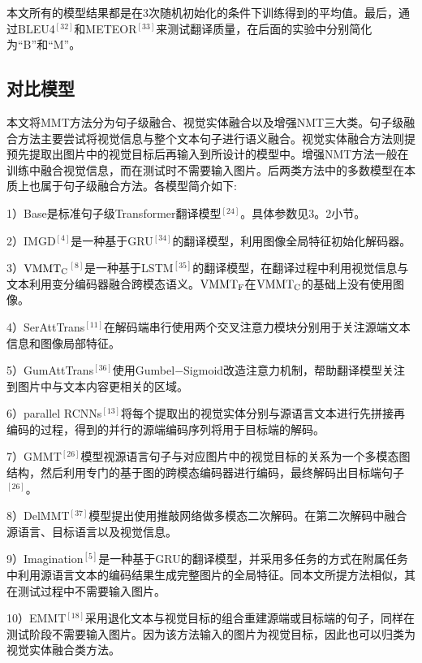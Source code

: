 本文所有的模型结果都是在3次随机初始化的条件下训练得到的平均值。最后，通过BLEU4$^{[32]}$和METEOR$^{[33]}$来测试翻译质量，在后面的实验中分别简化为``B''和``M''。


\subsection{对比模型}
本文将MMT方法分为句子级融合、视觉实体融合以及增强NMT三大类。句子级融合方法主要尝试将视觉信息与整个文本句子进行语义融合。视觉实体融合方法则提预先提取出图片中的视觉目标后再输入到所设计的模型中。增强NMT方法一般在训练中融合视觉信息，而在测试时不需要输入图片。后两类方法中的多数模型在本质上也属于句子级融合方法。各模型简介如下:

1）Base是标准句子级Transformer翻译模型$^{[24]}$。具体参数见3。2小节。

2）IMGD$^{[4]}$是一种基于GRU$^{[34]}$的翻译模型，利用图像全局特征初始化解码器。

3）${\rm VMMT_C}$$^{[8]}$是一种基于LSTM$^{[35]}$的翻译模型，在翻译过程中利用视觉信息与文本利用变分编码器融合跨模态语义。${\rm VMMT_F}$在${\rm VMMT_C}$的基础上没有使用图像。

4）SerAttTrans$^{[11]}$在解码端串行使用两个交叉注意力模块分别用于关注源端文本信息和图像局部特征。

5）GumAttTrans$^{[36]}$使用Gumbel$-$Sigmoid改造注意力机制，帮助翻译模型关注到图片中与文本内容更相关的区域。

6）parallel RCNNs$^{[13]}$将每个提取出的视觉实体分别与源语言文本进行先拼接再编码的过程，得到的并行的源端编码序列将用于目标端的解码。

7）GMMT$^{[26]}$模型视源语言句子与对应图片中的视觉目标的关系为一个多模态图结构，然后利用专门的基于图的跨模态编码器进行编码，最终解码出目标端句子$^{[26]}$。

8）DelMMT$^{[37]}$模型提出使用推敲网络做多模态二次解码。在第二次解码中融合源语言、目标语言以及视觉信息。

9）Imagination$^{[5]}$是一种基于GRU的翻译模型，并采用多任务的方式在附属任务中利用源语言文本的编码结果生成完整图片的全局特征。同本文所提方法相似，其在测试过程中不需要输入图片。

10）EMMT$^{[18]}$采用退化文本与视觉目标的组合重建源端或目标端的句子，同样在测试阶段不需要输入图片。因为该方法输入的图片为视觉目标，因此也可以归类为视觉实体融合类方法。
